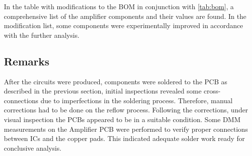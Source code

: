 
In the table with modifications to the BOM in conjunction with \autoref{tab:bom}, a comprehensive list of the amplifier components and their values are found. In the modification list, some components were experimentally improved in accordance with the further analysis.

\subsection{Remarks}
After the circuits were produced, components were soldered to the PCB as described in the previous section, initial inspections revealed some cross-connections due to imperfections in the soldering process. Therefore, manual corrections had to be done on the reflow process. Following the corrections, under visual inspection the PCBs appeared to be in a suitable condition. Some DMM measurements on the Amplifier PCB were performed to verify proper connections between ICs and the copper pads. This indicated adequate solder work ready for conclusive analysis.